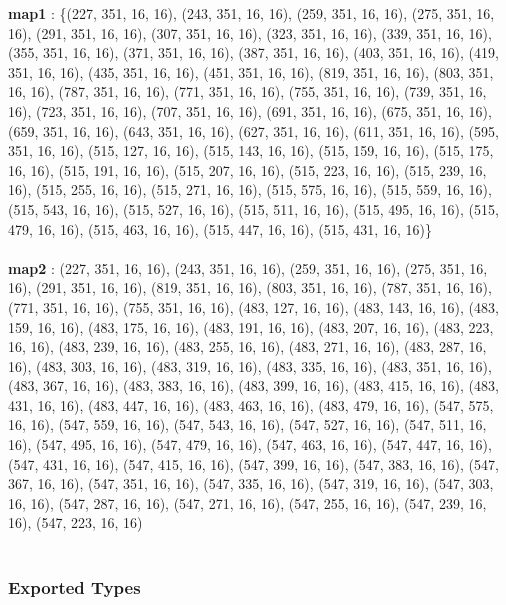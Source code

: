 \documentclass[12pt, titlepage]{article}
\begin{document}
\textbf{map1} : \{(227, 351, 16, 16),
 (243, 351, 16, 16),
 (259, 351, 16, 16),
 (275, 351, 16, 16),
 (291, 351, 16, 16),
 (307, 351, 16, 16),
 (323, 351, 16, 16),
 (339, 351, 16, 16),
 (355, 351, 16, 16),
 (371, 351, 16, 16),
 (387, 351, 16, 16),
 (403, 351, 16, 16),
 (419, 351, 16, 16),
 (435, 351, 16, 16),
 (451, 351, 16, 16),
 (819, 351, 16, 16),
 (803, 351, 16, 16),
 (787, 351, 16, 16),
 (771, 351, 16, 16),
 (755, 351, 16, 16),
 (739, 351, 16, 16),
 (723, 351, 16, 16),
 (707, 351, 16, 16),
 (691, 351, 16, 16),
 (675, 351, 16, 16),
 (659, 351, 16, 16),
 (643, 351, 16, 16),
 (627, 351, 16, 16),
 (611, 351, 16, 16),
 (595, 351, 16, 16),
 (515, 127, 16, 16),
 (515, 143, 16, 16),
 (515, 159, 16, 16),
 (515, 175, 16, 16),
 (515, 191, 16, 16),
(515, 207, 16, 16),
 (515, 223, 16, 16),
 (515, 239, 16, 16),
 (515, 255, 16, 16),
 (515, 271, 16, 16),
 (515, 575, 16, 16),
 (515, 559, 16, 16),
 (515, 543, 16, 16),
 (515, 527, 16, 16),
 (515, 511, 16, 16),
 (515, 495, 16, 16),
 (515, 479, 16, 16),
 (515, 463, 16, 16),
 (515, 447, 16, 16),
 (515, 431, 16, 16)\} \\\\
 \textbf{map2} : (227, 351, 16, 16),
 (243, 351, 16, 16),
 (259, 351, 16, 16),
 (275, 351, 16, 16),
 (291, 351, 16, 16),
 (819, 351, 16, 16),
 (803, 351, 16, 16),
 (787, 351, 16, 16),
 (771, 351, 16, 16),
 (755, 351, 16, 16),
 (483, 127, 16, 16),
 (483, 143, 16, 16),
 (483, 159, 16, 16),
 (483, 175, 16, 16),
 (483, 191, 16, 16),
 (483, 207, 16, 16),
 (483, 223, 16, 16),
 (483, 239, 16, 16),
 (483, 255, 16, 16),
 (483, 271, 16, 16),
 (483, 287, 16, 16),
 (483, 303, 16, 16),
 (483, 319, 16, 16),
 (483, 335, 16, 16),
 (483, 351, 16, 16),
 (483, 367, 16, 16),
 (483, 383, 16, 16),
 (483, 399, 16, 16),
 (483, 415, 16, 16),
 (483, 431, 16, 16),
 (483, 447, 16, 16),
 (483, 463, 16, 16),
 (483, 479, 16, 16),
 (547, 575, 16, 16),
 (547, 559, 16, 16),
 (547, 543, 16, 16),
 (547, 527, 16, 16),
 (547, 511, 16, 16),
 (547, 495, 16, 16),
 (547, 479, 16, 16),
 (547, 463, 16, 16),
 (547, 447, 16, 16),
 (547, 431, 16, 16),
 (547, 415, 16, 16),
 (547, 399, 16, 16),
 (547, 383, 16, 16),
 (547, 367, 16, 16),
 (547, 351, 16, 16),
 (547, 335, 16, 16),
 (547, 319, 16, 16),
 (547, 303, 16, 16),
 (547, 287, 16, 16),
 (547, 271, 16, 16),
 (547, 255, 16, 16),
 (547, 239, 16, 16),
 (547, 223, 16, 16)\\\\
 


\subsubsection* {Exported Types}
\end{document}
